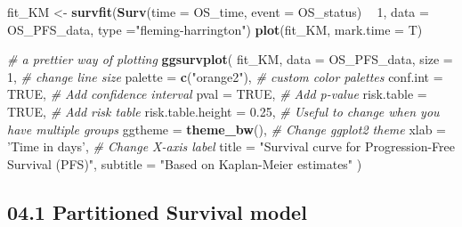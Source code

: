 \documentclass[
]{article}
\newenvironment{Shaded}{\begin{snugshade}}{\end{snugshade}}
\newcommand{\CommentTok}[1]{\textcolor[rgb]{0.56,0.35,0.01}{\textit{#1}}}
\newcommand{\DataTypeTok}[1]{\textcolor[rgb]{0.13,0.29,0.53}{#1}}
\newcommand{\DecValTok}[1]{\textcolor[rgb]{0.00,0.00,0.81}{#1}}
\newcommand{\FloatTok}[1]{\textcolor[rgb]{0.00,0.00,0.81}{#1}}
\newcommand{\KeywordTok}[1]{\textcolor[rgb]{0.13,0.29,0.53}{\textbf{#1}}}
\newcommand{\NormalTok}[1]{#1}
\newcommand{\OperatorTok}[1]{\textcolor[rgb]{0.81,0.36,0.00}{\textbf{#1}}}
\newcommand{\OtherTok}[1]{\textcolor[rgb]{0.56,0.35,0.01}{#1}}
\newcommand{\StringTok}[1]{\textcolor[rgb]{0.31,0.60,0.02}{#1}}
\begin{document}
\begin{Shaded}
\begin{Highlighting}[]
\NormalTok{fit_KM <-}\StringTok{ }\KeywordTok{survfit}\NormalTok{(}\KeywordTok{Surv}\NormalTok{(}\DataTypeTok{time =}\NormalTok{ OS_time, }\DataTypeTok{event =}\NormalTok{ OS_status) }\OperatorTok{~}\StringTok{ }\DecValTok{1}\NormalTok{, }\DataTypeTok{data =}\NormalTok{ OS_PFS_data, }
                       \DataTypeTok{type =}\StringTok{"fleming-harrington"}\NormalTok{)}
\KeywordTok{plot}\NormalTok{(fit_KM, }\DataTypeTok{mark.time =}\NormalTok{ T)}

\CommentTok{# a prettier way of plotting}
\KeywordTok{ggsurvplot}\NormalTok{(}
\NormalTok{  fit_KM, }
  \DataTypeTok{data =}\NormalTok{ OS_PFS_data, }
  \DataTypeTok{size =} \DecValTok{1}\NormalTok{,                  }\CommentTok{# change line size}
  \DataTypeTok{palette =} \KeywordTok{c}\NormalTok{(}\StringTok{"orange2"}\NormalTok{),    }\CommentTok{# custom color palettes}
  \DataTypeTok{conf.int =} \OtherTok{TRUE}\NormalTok{,           }\CommentTok{# Add confidence interval}
  \DataTypeTok{pval =} \OtherTok{TRUE}\NormalTok{,               }\CommentTok{# Add p-value}
  \DataTypeTok{risk.table =} \OtherTok{TRUE}\NormalTok{,         }\CommentTok{# Add risk table}
  \DataTypeTok{risk.table.height =} \FloatTok{0.25}\NormalTok{,  }\CommentTok{# Useful to change when you have multiple groups}
  \DataTypeTok{ggtheme =} \KeywordTok{theme_bw}\NormalTok{(),      }\CommentTok{# Change ggplot2 theme}
  \DataTypeTok{xlab =} \StringTok{'Time in days'}\NormalTok{,     }\CommentTok{# Change X-axis label}
  \DataTypeTok{title    =} \StringTok{"Survival curve for Progression-Free Survival (PFS)"}\NormalTok{, }
  \DataTypeTok{subtitle =} \StringTok{"Based on Kaplan-Meier estimates"}
\NormalTok{) }
\end{Highlighting}
\end{Shaded}

\hypertarget{partitioned-survival-model}{%
\subsection{04.1 Partitioned Survival
model}\label{partitioned-survival-model}}
\end{document}
